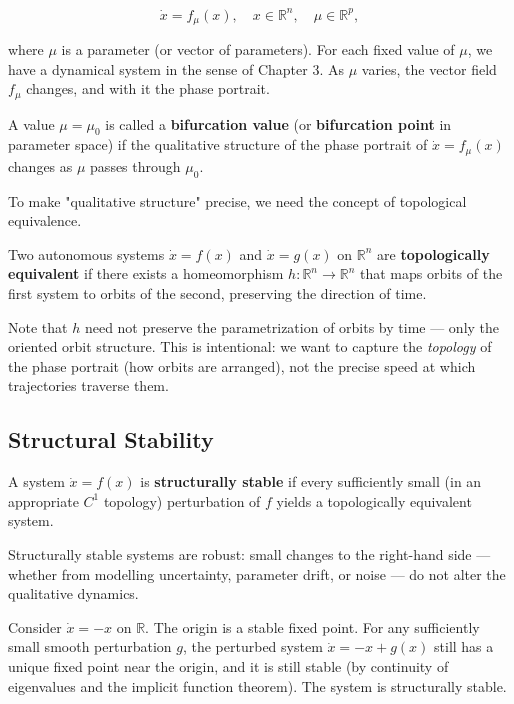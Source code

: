 \[
\dot{x} = f_\mu(x), \quad x \in \mathbb{R}^n, \quad \mu \in \mathbb{R}^p,
\]

where $\mu$ is a parameter (or vector of parameters). For each fixed value of $\mu$, we have a dynamical system in the sense of Chapter 3. As $\mu$ varies, the vector field $f_\mu$ changes, and with it the phase portrait.

\begin{definition}\label{def:5.1}
A value $\mu = \mu_0$ is called a \textbf{bifurcation value} (or \textbf{bifurcation point} in parameter space) if the qualitative structure of the phase portrait of $\dot{x} = f_\mu(x)$ changes as $\mu$ passes through $\mu_0$.

To make "qualitative structure" precise, we need the concept of topological equivalence.
\end{definition}


\begin{definition}\label{def:5.2}
Two autonomous systems $\dot{x} = f(x)$ and $\dot{x} = g(x)$ on $\mathbb{R}^n$ are \textbf{topologically equivalent} if there exists a homeomorphism $h: \mathbb{R}^n \to \mathbb{R}^n$ that maps orbits of the first system to orbits of the second, preserving the direction of time.

Note that $h$ need not preserve the parametrization of orbits by time --- only the oriented orbit structure. This is intentional: we want to capture the \textit{topology} of the phase portrait (how orbits are arranged), not the precise speed at which trajectories traverse them.
\end{definition}


\subsection{Structural Stability}\label{sec:5.1.2}

\begin{definition}\label{def:5.3}
A system $\dot{x} = f(x)$ is \textbf{structurally stable} if every sufficiently small (in an appropriate $C^1$ topology) perturbation of $f$ yields a topologically equivalent system.

Structurally stable systems are robust: small changes to the right-hand side --- whether from modelling uncertainty, parameter drift, or noise --- do not alter the qualitative dynamics.
\end{definition}


\begin{example}
Consider $\dot{x} = -x$ on $\mathbb{R}$. The origin is a stable fixed point. For any sufficiently small smooth perturbation $g$, the perturbed system $\dot{x} = -x + g(x)$ still has a unique fixed point near the origin, and it is still stable (by continuity of eigenvalues and the implicit function theorem). The system is structurally stable.
\end{example}


